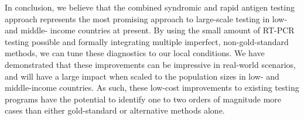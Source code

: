 \documentclass[]{elsarticle} %
\begin{document}
In conclusion, we believe that the combined syndromic and rapid antigen
testing approach represents the most promising approach to large-scale
testing in low- and middle- income countries at present. By using the
small amount of RT-PCR testing possible and formally integrating
multiple imperfect, non-gold-standard methods, we can tune these
diagnostics to our local conditions. We have demonstrated that these
improvements can be impressive in real-world scenarios, and will have a
large impact when scaled to the population sizes in low- and
middle-income countries. As such, these low-cost improvements to
existing testing programs have the potential to identify one to two
orders of magnitude more cases than either gold-standard or alternative
methods alone.
\end{document}
